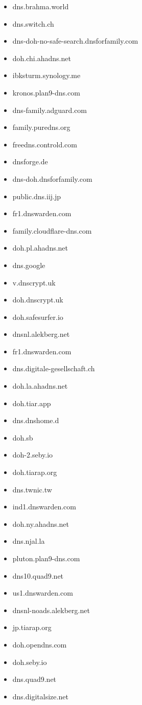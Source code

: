 \begin{itemize}
\item dns.brahma.world
\item dns.switch.ch
\item dns-doh-no-safe-search.dnsforfamily.com
\item doh.chi.ahadns.net
\item ibksturm.synology.me
\item kronos.plan9-dns.com
\item dns-family.adguard.com
\item family.puredns.org
\item freedns.controld.com
\item dnsforge.de
\item dns-doh.dnsforfamily.com
\item public.dns.iij.jp
\item fr1.dnswarden.com
\item family.cloudflare-dns.com
\item doh.pl.ahadns.net
\item dns.google
\item v.dnscrypt.uk
\item doh.dnscrypt.uk
\item doh.safesurfer.io
\item dnsnl.alekberg.net
\item fr1.dnswarden.com
\item dns.digitale-gesellschaft.ch
\item doh.la.ahadns.net
\item doh.tiar.app
\item dns.dnshome.d
\item doh.sb
\item doh-2.seby.io
\item doh.tiarap.org
\item dns.twnic.tw
\item ind1.dnswarden.com
\item doh.ny.ahadns.net
\item dns.njal.la
\item pluton.plan9-dns.com
\item dns10.quad9.net
\item us1.dnswarden.com
\item dnsnl-noads.alekberg.net
\item jp.tiarap.org
\item doh.opendns.com
\item doh.seby.io
\item dns.quad9.net
\item dns.digitalsize.net

\end{itemize}
